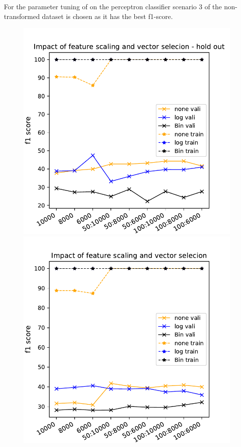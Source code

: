 \documentclass[11pt]{article}
\begin{document}
\newline
For the parameter tuning of on the perceptron classifier scenario 3 of the non-transformed dataset is chosen as it has the best f1-score.
%
\begin{figure}[t]
\begin{minipage}[t]{0.33\textwidth}
\includegraphics[width=1\linewidth]{amazon/perc_scaling_vect_selection_HO.pdf}
\end{minipage}
\begin{minipage}[t]{0.33\textwidth}
\includegraphics[width=1\linewidth]{amazon/perc_scaling_vect_selection.pdf}

\end{minipage}
\end{figure}
\end{document}
